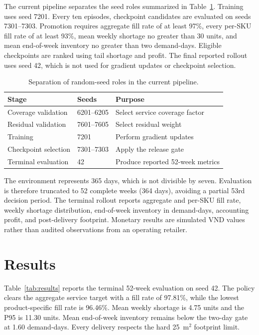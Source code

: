 \documentclass[pdflatex,sn-mathphys-num]{sn-jnl}
\begin{document}
The current pipeline separates the seed roles summarized in Table~\ref{tab:seeds}. Training uses seed 7201. Every ten episodes, checkpoint candidates are evaluated on seeds 7301--7303. Promotion requires aggregate fill rate of at least 97\%, every per-SKU fill rate of at least 93\%, mean weekly shortage no greater than 30 units, and mean end-of-week inventory no greater than two demand-days. Eligible checkpoints are ranked using tail shortage and profit. The final reported rollout uses seed 42, which is not used for gradient updates or checkpoint selection.

\begin{table}[ht]
\centering
\caption{Separation of random-seed roles in the current pipeline.}
\label{tab:seeds}
\begin{tabular}{@{}lll@{}}
\toprule
Stage & Seeds & Purpose \\
\midrule
Coverage validation & 6201--6205 & Select service coverage factor \\
Residual validation & 7601--7605 & Select residual weight \\
Training & 7201 & Perform gradient updates \\
Checkpoint selection & 7301--7303 & Apply the release gate \\
Terminal evaluation & 42 & Produce reported 52-week metrics \\
\bottomrule
\end{tabular}
\end{table}

The environment represents 365 days, which is not divisible by seven. Evaluation is therefore truncated to 52 complete weeks (364 days), avoiding a partial 53rd decision period. The terminal rollout reports aggregate and per-SKU fill rate, weekly shortage distribution, end-of-week inventory in demand-days, accounting profit, and post-delivery footprint. Monetary results are simulated VND values rather than audited observations from an operating retailer.

\section{Results}\label{sec:results}

Table~\ref{tab:results} reports the terminal 52-week evaluation on seed 42. The policy clears the aggregate service target with a fill rate of 97.81\%, while the lowest product-specific fill rate is 96.46\%. Mean weekly shortage is 4.75 units and the P95 is 11.30 units. Mean end-of-week inventory remains below the two-day gate at 1.60 demand-days. Every delivery respects the hard 25~m$^2$ footprint limit.
\end{document}
